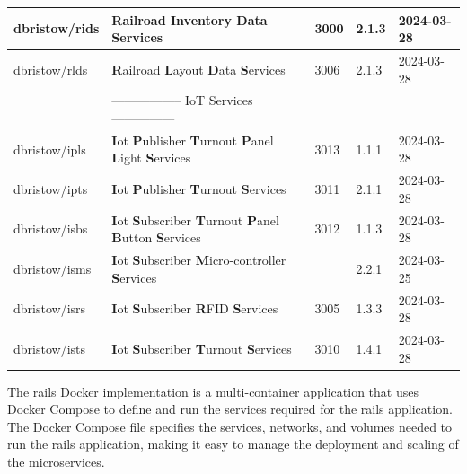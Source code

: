 \begin{longtable}{|L{3cm}|L{7cm}|L{1cm}|L{1.5cm}|L{2cm}|}
  dbristow/rids & \textbf{R}ailroad \textbf{I}nventory \textbf{D}ata \textbf{S}ervices  & 3000 & 2.1.3 & 2024-03-28 \\ \hline
  dbristow/rlds & \textbf{R}ailroad \textbf{L}ayout \textbf{D}ata \textbf{S}ervices  & 3006 & 2.1.3 & 2024-03-28 \\ \hline
  & ----------------- IoT Services --------------- &  &  & \\ \hline
  dbristow/ipls & \textbf{I}ot \textbf{P}ublisher \textbf{T}urnout \textbf{P}anel \textbf{L}ight \textbf{S}ervices & 3013 & 1.1.1 & 2024-03-28 \\ \hline
  dbristow/ipts & \textbf{I}ot \textbf{P}ublisher \textbf{T}urnout \textbf{S}ervices & 3011 & 2.1.1 & 2024-03-28 \\ \hline
  dbristow/isbs & \textbf{I}ot \textbf{S}ubscriber \textbf{T}urnout \textbf{P}anel \textbf{B}utton \textbf{S}ervices & 3012 & 1.1.3 & 2024-03-28 \\ \hline
  dbristow/isms & \textbf{I}ot \textbf{S}ubscriber \textbf{M}icro-controller \textbf{S}ervices &  & 2.2.1 & 2024-03-25 \\ \hline
  dbristow/isrs & \textbf{I}ot \textbf{S}ubscriber \textbf{R}FID \textbf{S}ervices & 3005 & 1.3.3 & 2024-03-28 \\ \hline
  dbristow/ists & \textbf{I}ot \textbf{S}ubscriber \textbf{T}urnout \textbf{S}ervices & 3010 & 1.4.1 & 2024-03-28 \\ \hline
    \end{longtable}
The \gls{rails} Docker implementation is a multi-container application that uses Docker Compose to define and run the services required for the \gls{rails} application. The Docker Compose file specifies the services, networks, and volumes needed to run the \gls{rails} application, making it easy to manage the deployment and scaling of the microservices.
